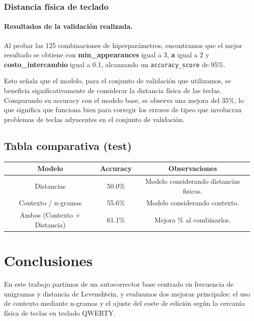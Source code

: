 \documentclass[12pt,a4paper]{article}
\begin{document}
\subsubsection{Distancia física de teclado}

\paragraph{Resultados de la validación realizada.}
Al probar las 125 combinaciones de hiperparámetros, encontramos que el mejor resultado se obtiene con \textbf{min\_appearances} igual a 3, \textbf{a} igual a 2 y \textbf{costo\_intercambio} igual a 0.1, alcanzando un \texttt{accuracy\_score} de 95\%.

Esto señala que el modelo, para el conjunto de validación que utilizamos, se beneficia significativamente de considerar la distancia física de las teclas. Comparando su accuracy con el modelo base, se observa una mejora del 35\%, lo que significa que funciona bien para corregir los errores de tipeo que involucran problemas de teclas adyacentes en el conjunto de validación.

\subsection{Tabla comparativa (test)}

\begin{center}
\begin{tabular}{|c|c|c|}
\hline
\textbf{Modelo} & \textbf{Accuracy} & \textbf{Observaciones} \\
\hline
Distancias & 50.0\% & Modelo considerando distancias fisicas. \\
\hline
Contexto / n-gramas & 55.6\% & Modelo considerando contexto. \\
\hline
Ambos (Contexto + Distancia) & 61.1\% & Mejora \% al combinarlos. \\
\hline
\end{tabular}
\end{center}

\clearpage

\section{Conclusiones}

En este trabajo partimos de un autocorrector base centrado en frecuencia 
de unigramas y distancia de Levenshtein, y evaluamos dos mejoras principales: 
el uso de contexto mediante n-gramas y el ajuste del coste de edición según 
la cercanía física de teclas en teclado QWERTY.
\end{document}
